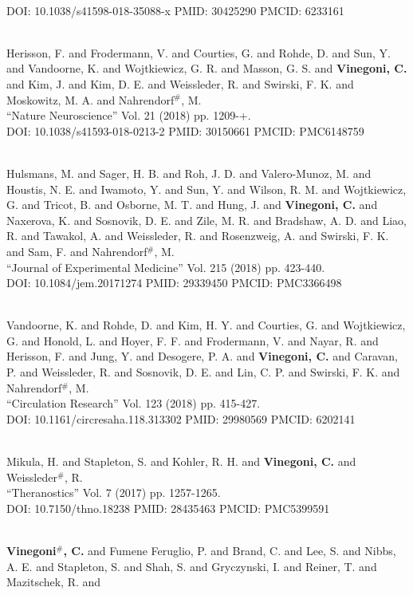 \\ DOI: 10.1038/s41598-018-35088-x PMID: 30425290 PMCID: 6233161\item {} \\ Herisson, F. and Frodermann, V. and Courties, G. and Rohde, D. and Sun, Y. and Vandoorne, K. and Wojtkiewicz, G. R. and Masson, G. S. and {\bf Vinegoni, C.} and Kim, J. and Kim, D. E. and Weissleder, R. and Swirski, F. K. and Moskowitz, M. A. and Nahrendorf$^\#$, M. \\ ``Nature Neuroscience'' Vol. 21 (2018) pp. 1209-+. \\ DOI: 10.1038/s41593-018-0213-2 PMID: 30150661 PMCID: PMC6148759 \item {} \\ Hulsmans, M. and Sager, H. B. and Roh, J. D. and Valero-Munoz, M. and Houstis, N. E. and Iwamoto, Y. and Sun, Y. and Wilson, R. M. and Wojtkiewicz, G. and Tricot, B. and Osborne, M. T. and Hung, J. and {\bf Vinegoni, C.} and Naxerova, K. and Sosnovik, D. E. and Zile, M. R. and Bradshaw, A. D. and Liao, R. and Tawakol, A. and Weissleder, R. and Rosenzweig, A. and Swirski, F. K. and Sam, F. and Nahrendorf$^\#$, M. \\ ``Journal of Experimental Medicine'' Vol. 215 (2018) pp. 423-440. \\ DOI: 10.1084/jem.20171274 PMID: 29339450 PMCID: PMC3366498\item {} \\ Vandoorne, K. and Rohde, D. and Kim, H. Y. and Courties, G. and Wojtkiewicz, G. and Honold, L. and Hoyer, F. F. and Frodermann, V. and Nayar, R. and Herisson, F. and Jung, Y. and Desogere, P. A. and {\bf Vinegoni, C.} and Caravan, P. and Weissleder, R. and Sosnovik, D. E. and Lin, C. P. and Swirski, F. K. and Nahrendorf$^\#$, M. \\ ``Circulation Research'' Vol. 123 (2018) pp. 415-427. \\ DOI: 10.1161/circresaha.118.313302 PMID: 29980569 PMCID: 6202141\item {} \\ Mikula, H. and Stapleton, S. and Kohler, R. H. and {\bf Vinegoni, C.} and Weissleder$^\#$, R. \\ ``Theranostics'' Vol. 7 (2017) pp. 1257-1265. \\ DOI: 10.7150/thno.18238 PMID: 28435463 PMCID: PMC5399591\item {} \\ {\bf Vinegoni$^\#$, C.} and Fumene Feruglio, P. and Brand, C. and Lee, S. and Nibbs, A. E. and Stapleton, S. and Shah, S. and Gryczynski, I. and Reiner, T. and Mazitschek, R. and 